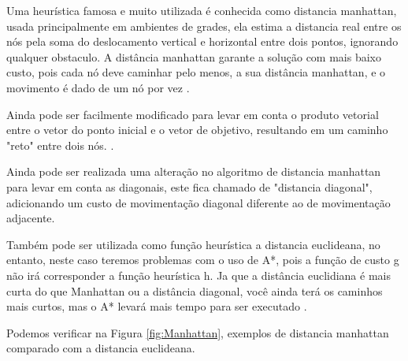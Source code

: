 Uma heurística famosa e muito utilizada é conhecida como distancia manhattan, usada principalmente em ambientes de grades, ela estima a distancia real entre os nós pela soma do deslocamento vertical e horizontal entre dois pontos, ignorando qualquer obstaculo.
A distância manhattan garante a solução com mais baixo custo, pois cada nó deve caminhar pelo menos, a sua distância manhattan, e o movimento é dado de um nó por vez \cite{Korf2000}.

Ainda pode ser facilmente modificado para levar em conta o produto vetorial entre o vetor do ponto inicial e o vetor de objetivo, resultando em um caminho "reto" entre dois nós. \cite{GameProgrammingHeuristics}.

Ainda pode ser realizada uma alteração no algoritmo de distancia manhattan para levar em conta as diagonais, este fica chamado de "distancia diagonal", adicionando um custo de movimentação diagonal diferente ao de movimentação adjacente.

Também pode ser utilizada como função heurística a distancia euclideana, no entanto, neste caso teremos problemas com o uso de A*, pois a função de custo g não irá corresponder a função heurística h. Ja que a  distância euclidiana é mais curta do que Manhattan ou a distância diagonal, você ainda terá os caminhos mais curtos, mas o A* levará mais tempo para ser executado \cite{GameProgrammingHeuristics}.

Podemos verificar na Figura \ref{fig:Manhattan}, exemplos de distancia manhattan comparado com a distancia euclideana.

\begin{minipage}{\linewidth}
    \label{fig:Manhattan}
\end{minipage}


